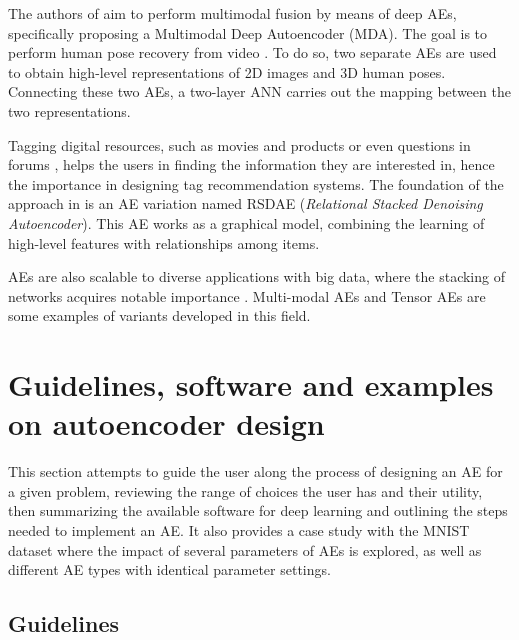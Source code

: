 The authors of   aim to perform multimodal fusion by means of deep AEs, specifically proposing a Multimodal Deep Autoencoder (MDA). The goal is to perform human pose recovery from video . To do so, two separate AEs are used to obtain high-level representations of 2D images and 3D human poses. Connecting these two AEs, a two-layer ANN carries out the mapping between the two representations.

Tagging digital resources, such as movies and products  or even questions in forums , helps the users in finding the information they are interested in, hence the importance in designing tag recommendation systems. The foundation of the approach in  is an AE variation named  RSDAE (\textit{Relational Stacked Denoising Autoencoder}). This AE works as a graphical model, combining the learning of high-level features with relationships among items.

AEs are also scalable to diverse applications with big data, where the stacking of networks acquires notable importance . Multi-modal AEs and Tensor AEs are some examples of variants developed in this field.

\section{Guidelines, software and examples on autoencoder design}\label{p1Sec.HowToChoose}

This section attempts to guide the user along the process of designing an AE for a given problem, reviewing the range of choices the user has and their utility, then summarizing the available software for deep learning and outlining the steps needed to implement an AE. It also provides a case study with the MNIST dataset where the impact of several parameters of AEs is explored, as well as different AE types with identical parameter settings.


\subsection{Guidelines}

